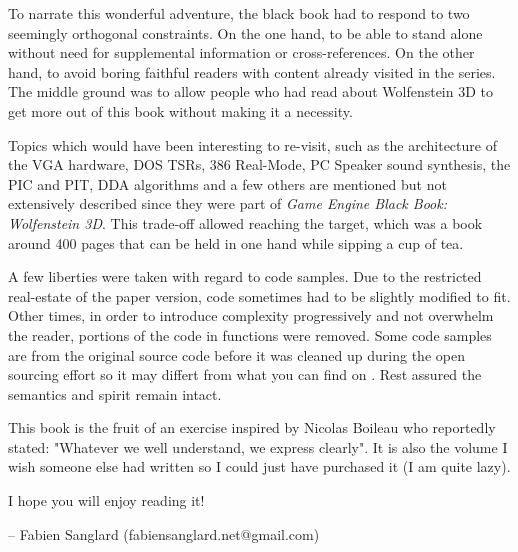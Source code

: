  To narrate this wonderful adventure, the black book had to respond to two seemingly orthogonal constraints. On the one hand, to be able to stand alone without need for supplemental information or cross-references. On the other hand, to avoid boring faithful readers with content already visited in the series. The middle ground was to allow people who had read about Wolfenstein 3D to get more out of this book without making it a necessity.\\
 \par
 Topics which would have been interesting to re-visit, such as the architecture of the VGA hardware, DOS TSRs, 386 Real-Mode, PC Speaker sound synthesis, the PIC and PIT, DDA algorithms and a few others are mentioned but not extensively described since they were part of \textit{Game Engine Black Book: Wolfenstein 3D}. This trade-off allowed reaching the target, which was a book around 400 pages that can be held in one hand while sipping a cup of tea.\\
\par
A few liberties were taken with regard to code samples. Due to the restricted real-estate of the paper version, code sometimes had to be slightly modified to fit. Other times, in order to introduce complexity progressively and not overwhelm the reader, portions of the code in functions were removed. Some code samples are from the original source code before it was cleaned up during the open sourcing effort so it may differt from what you can find on . Rest assured the semantics and spirit remain intact.\\
\par 
This book is the fruit of an exercise inspired by Nicolas Boileau who reportedly stated: "Whatever we well understand, we express clearly". It is also the volume I wish someone else had written so I could just have purchased it (I am quite lazy).\\
\par
I hope you will enjoy reading it!\\
\par
-- Fabien Sanglard (fabiensanglard.net@gmail.com)
